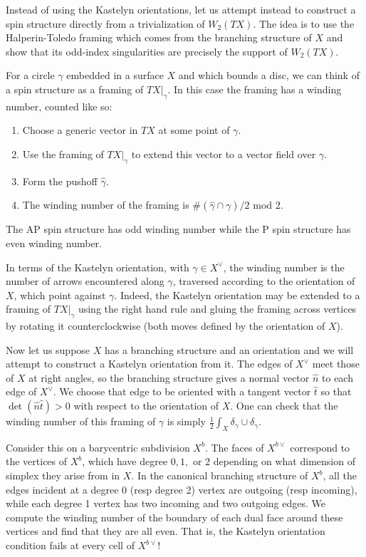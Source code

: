 \documentclass{article}
\theoremstyle{definition}
\begin{document}
Instead of using the Kastelyn orientations, let us attempt instead to construct a spin structure directly from a trivialization of $W_2(TX)$. The idea is to use the Halperin-Toledo framing which comes from the branching structure of $X$ and show that its odd-index singularities are precisely the support of $W_2(TX)$.

For a circle $\gamma$ embedded in a surface $X$ and which bounds a disc, we can think of a spin structure as a framing of $TX|_\gamma$. In this case the framing has a winding number, counted like so:
\begin{enumerate}
    \item Choose a generic vector in $TX$ at some point of $\gamma$.
    \item Use the framing of $TX|_\gamma$ to extend this vector to a vector field over $\gamma$.
    \item Form the pushoff $\hat \gamma$.
    \item The winding number of the framing is $\#(\hat \gamma \cap \gamma)/2$ mod 2.
\end{enumerate}
The AP spin structure has odd winding number while the P spin structure has even winding number.

In terms of the Kastelyn orientation, with $\gamma \in X^\vee$, the winding number is the number of arrows encountered along $\gamma$, traversed according to the orientation of $X$, which point against $\gamma$. Indeed, the Kastelyn orientation may be extended to a framing of $TX|_\gamma$ using the right hand rule and gluing the framing across vertices by rotating it counterclockwise \cite{Cimasoni2007} (both moves defined by the orientation of $X$).

Now let us suppose $X$ has a branching structure and an orientation and we will attempt to construct a Kastelyn orientation from it. The edges of $X^\vee$ meet those of $X$ at right angles, so the branching structure gives a normal vector $\hat n$ to each edge of $X^\vee$. We choose that edge to be oriented with a tangent vector $\hat t$ so that $\det(\hat n \hat t) > 0$ with respect to the orientation of $X$. One can check that the winding number of this framing of $\gamma$ is simply $\frac{1}{2}\int_X \delta_\gamma \cup \delta_\gamma$.

Consider this on a barycentric subdivision $X^b$. The faces of $X^{b\vee}$ correspond to the vertices of $X^b$, which have degree $0, 1,$ or $2$ depending on what dimension of simplex they arise from in $X$. In the canonical branching structure of $X^b$, all the edges incident at a degree 0 (resp degree 2) vertex are outgoing (resp incoming), while each degree 1 vertex has two incoming and two outgoing edges. We compute the winding number of the boundary of each dual face around these vertices and find that they are all even. That is, the Kastelyn orientation condition fails at every cell of $X^{b\vee}$!
\end{document}
